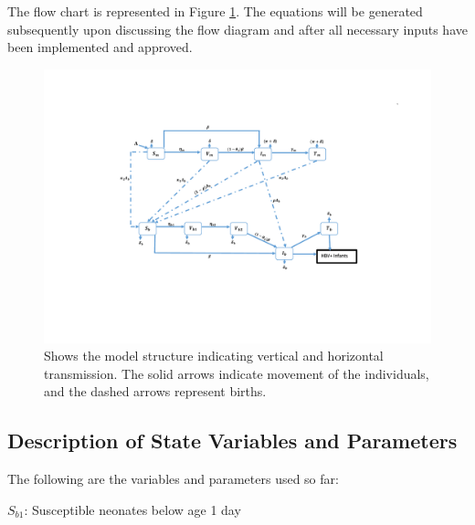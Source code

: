 \documentclass[11pt,a4paper]{article}
\begin{document}
		The flow chart is represented in Figure \ref{fig:flowchart}. The equations will be generated subsequently upon discussing the flow diagram and after all necessary inputs have been implemented and approved.
		\begin{figure}[h!]
			\includegraphics[scale=0.7]{new_model}
			\caption{Shows the model structure indicating vertical and horizontal transmission. The solid arrows indicate movement of the individuals, and the dashed arrows represent births.} \label{fig:flowchart}
		\end{figure}
		\newpage
	\subsection{Description of State Variables and Parameters}
	The following are the variables and parameters used so far:\vspace{1.5mm}
	
	$S_{b1}$: Susceptible neonates below age 1 day \vspace{1.5mm}
	
\end{document}
